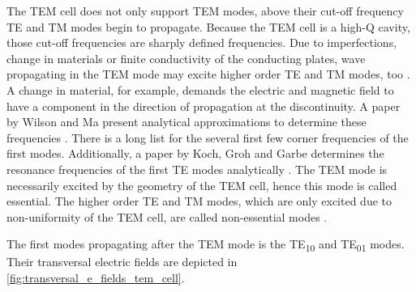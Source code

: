 The TEM cell does not only support TEM modes, above their cut-off frequency TE and TM modes begin to propagate. Because the TEM cell is a high-Q cavity, those cut-off frequencies are sharply defined frequencies. Due to imperfections, change in materials or finite conductivity of the conducting plates, wave propagating in the TEM mode may excite higher order TE and TM modes, too \cite{10791592}. A change in material, for example, demands the electric and magnetic field to have a component in the direction of propagation at the discontinuity. A paper by Wilson and Ma present analytical approximations to determine these frequencies \cite{Wilson_Ma_1986}.  There is a long list for the several first few corner frequencies of the first modes. Additionally, a paper by Koch, Groh and Garbe determines the resonance frequencies of the first TE modes analytically \cite{10791592}. The TEM mode is necessarily excited by the geometry of the TEM cell, hence this mode is called essential. The higher order TE and TM modes, which are only excited due to non-uniformity of the TEM cell, are called non-essential modes \cite{990711}.


The first modes propagating after the TEM mode is the TE\textsubscript{10} and TE\textsubscript{01} modes. Their transversal electric fields are depicted in \autoref{fig:transversal_e_fields_tem_cell}. 


